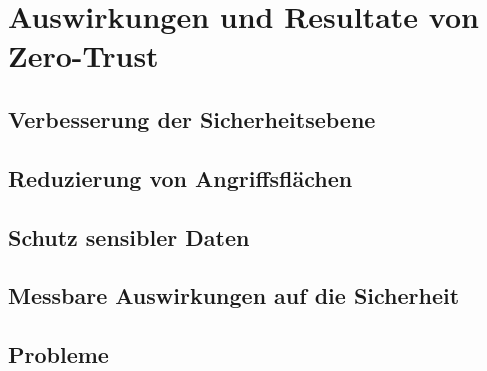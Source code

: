 \newpage


\section{Auswirkungen und Resultate von Zero-Trust}\label{sec:auswirkungen-und-resultate-von-zero-trust}

\subsection{Verbesserung der Sicherheitsebene}\label{subsec:verbesserung-der-sicherheitsebene}

\subsection{Reduzierung von Angriffsflächen}\label{subsec:reduzierung-von-angriffsflachen}

\subsection{Schutz sensibler Daten}\label{subsec:schutz-sensibler-daten}

\subsection{Messbare Auswirkungen auf die Sicherheit}\label{subsec:messbare-auswirkungen-auf-die-sicherheit}

\subsection{Probleme}\label{subsec:probleme}
